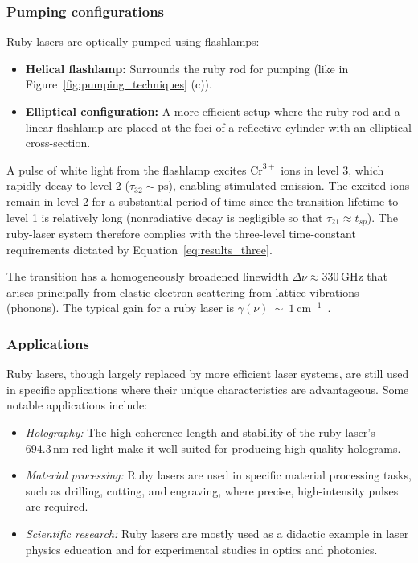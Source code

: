 \documentclass[prl,twocolumn]{revtex4-1}
\begin{document}
\subsubsection{\textbf{Pumping configurations}}
Ruby lasers are optically pumped using flashlamps:
\begin{itemize}
  \item \textbf{Helical flashlamp:} Surrounds the ruby rod for pumping (like in Figure~\ref{fig:pumping_techniques} (c)).
  \item \textbf{Elliptical configuration:} A more efficient setup where the ruby rod and a linear flashlamp are placed at the foci of a reflective cylinder with an elliptical cross-section.
\end{itemize}
A pulse of white light from the flashlamp excites \(\text{Cr}^{3+}\) ions in level 3, which rapidly decay to level 2 ($\tau_{32} \sim \text{ps}$), enabling stimulated emission. The excited ions remain in level 2
for a substantial period of time since the transition lifetime to level 1
is relatively long (nonradiative decay is negligible so that $\tau_21 \approx t_{sp}$). The ruby-laser system therefore complies with the three-level time-constant requirements dictated by Equation~\eqref{eq:results_three}.

The transition has a homogeneously broadened linewidth \(\Delta \nu \approx 330 \, \text{GHz}\) that arises principally from elastic electron scattering from lattice vibrations (phonons). The typical gain for a ruby laser is $\gamma(\nu)~\sim~1~\text{cm}^{-1}$~\cite{Koechner2010}.

\subsubsection{\textbf{Applications}}
Ruby lasers, though largely replaced by more efficient laser systems, are still used in specific applications where their unique characteristics are advantageous. Some notable applications include:
\begin{itemize}
  \item \textit{Holography:} The high coherence length and stability of the ruby laser's \(694.3 \, \text{nm}\) red light make it well-suited for producing high-quality holograms.
  \item \textit{Material processing:} Ruby lasers are used in specific material processing tasks, such as drilling, cutting, and engraving, where precise, high-intensity pulses are required.
  \item \textit{Scientific research:} Ruby lasers are mostly used as a didactic example in laser physics education and for experimental studies in optics and photonics.
\end{itemize}
\end{document}
